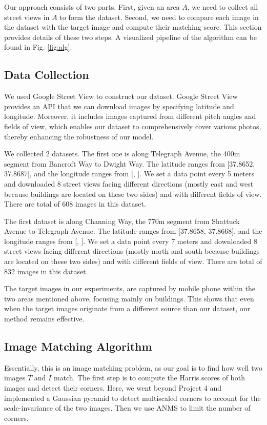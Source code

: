 \documentclass[10pt,twocolumn,letterpaper]{article}
\begin{document}
Our approach consists of two parts. First, given an area $A$, we need to collect all street views in $A$ to form the dataset. Second, we need to compare each image in the dataset with the target image and compute their matching score. This section provides details of these two steps. A visualized pipeline of the algorithm can be found in Fig. \ref{fig:alg}.

\subsection{Data Collection}
We used Google Street View to construct our dataset. Google Street View provides an API that we can download images by specifying latitude and longitude. Moreover, it includes images captured from different pitch angles and fields of view, which enables our dataset to comprehensively cover various photos, thereby enhancing the robustness of our model. 

We collected 2 datasets. The first one is along Telegraph Avenue, the 400m segment from Bancroft Way to Dwight Way. The latitude ranges from [37.8652, 37.8687], and the longitude ranges from [, ]. We set a data point every 5 meters and downloaded 8 street views facing different directions (mostly east and west because buildings are located on these two sides) and with different fields of view. There are total of 608 images in this dataset. 

The first dataset is along Channing Way, the 770m segment from Shattuck Avenue to Telegraph Avenue. The latitude ranges from [37.8658, 37.8668], and the longitude ranges from [, ]. We set a data point every 7 meters and downloaded 8 street views facing different directions (mostly north and south because buildings are located on these two sides) and with different fields of view. There are total of 832 images in this dataset. 

The target images in our experiments, are captured by mobile phone within the two areas mentioned above, focusing mainly on buildings. This shows that even when the target images originate from a different source than our dataset, our method remains effective.



\subsection{Image Matching Algorithm}

Essentially, this is an image matching problem, as our goal is to find how well two images $T$ and $I$ match. The first step is to compute the Harris scores of both images and detect their corners. \cite{Harris88alvey} Here, we went beyond Project 4 and implemented a Gaussian pyramid to detect multiscaled corners to account for the scale-invariance of the two images. Then we use ANMS \cite{1467310} to limit the number of corners. 
\end{document}

